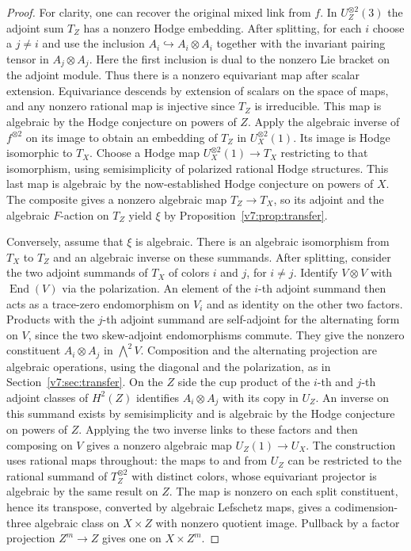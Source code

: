 \begin{proof}
For clarity, one can recover the original mixed link from $f$.
In $U_Z^{\otimes 2}(3)$ the adjoint sum $T_Z$ has a nonzero Hodge
embedding. After splitting, for each $i$ choose a $j\ne i$ and use
the inclusion $A_i\hookrightarrow A_i\otimes A_i$ together with
the invariant pairing tensor in $A_j\otimes A_j$. Here the first
inclusion is dual to the nonzero Lie bracket on the adjoint module.
Thus there is a nonzero equivariant map after scalar extension.
Equivariance descends by extension of scalars on the space of maps,
and any nonzero rational map is injective since $T_Z$ is irreducible.
This map is algebraic by the Hodge conjecture on powers of $Z$.
Apply the algebraic inverse of $f^{\otimes 2}$ on its image to obtain
an embedding of $T_Z$ in $U_X^{\otimes2}(1)$. Its image is Hodge
isomorphic to $T_X$. Choose a Hodge map $U_X^{\otimes2}(1)\to T_X$
restricting to that isomorphism, using semisimplicity of polarized
rational Hodge structures. This last map is algebraic by the
now-established Hodge conjecture on powers of $X$. The composite gives
a nonzero algebraic map $T_Z\to T_X$, so its adjoint and the algebraic
$F$-action on $T_Z$ yield $\xi$ by Proposition~\ref{v7:prop:transfer}.

Conversely, assume that $\xi$ is algebraic. There is an algebraic
isomorphism from $T_X$ to $T_Z$ and an algebraic inverse on these
summands. After splitting, consider the two adjoint summands of
$T_X$ of colors $i$ and $j$, for $i\ne j$. Identify $V\otimes V$
with $\operatorname{End}(V)$ via the polarization. An element of
the $i$-th adjoint summand then acts as a trace-zero endomorphism
on $V_i$ and as identity on the other two factors. Products with
the $j$-th adjoint summand are self-adjoint for the alternating
form on $V$, since the two skew-adjoint endomorphisms commute.
They give the nonzero constituent $A_i\otimes A_j$ in
$\bigwedge^2 V$. Composition and the alternating projection are
algebraic operations, using the diagonal and the polarization,
as in Section~\ref{v7:sec:transfer}. On the $Z$ side the cup product
of the $i$-th and $j$-th adjoint classes of $H^2(Z)$ identifies
$A_i\otimes A_j$ with its copy in $U_Z$. An inverse on this
summand exists by semisimplicity and is algebraic by the Hodge
conjecture on powers of $Z$. Applying the two inverse links to
these factors and then composing on $V$ gives a nonzero algebraic
map $U_Z(1)\to U_X$. The construction uses rational maps throughout:
the maps to and from $U_Z$ can be restricted to the rational summand
of $T_Z^{\otimes2}$ with distinct colors, whose equivariant projector
is algebraic by the same result on $Z$. The map is nonzero on each
split constituent, hence its transpose, converted by algebraic
Lefschetz maps, gives a codimension-three algebraic class on
$X\times Z$ with nonzero quotient image. Pullback by a factor
projection $Z^m\to Z$ gives one on $X\times Z^m$.
\end{proof}
